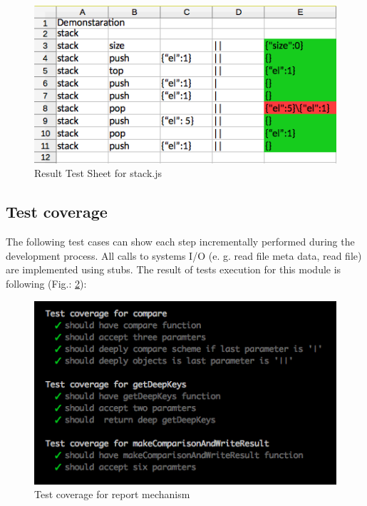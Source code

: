 {\begin{figure}[H]
	\centering
	\includegraphics[width=\linewidth]{grafiken/testSheetResult.png}
	\caption{Result Test Sheet for stack.js}
	\label{fig:resultTestSheet}
\end{figure}


\subsection{Test coverage}
The following test cases can show each step incrementally performed during the development process. All calls to systems I/O (e. g. read file meta data, read file) are implemented using stubs.
The result of tests execution  for this module is following (Fig.: \ref{fig:testReport}): 
\begin{figure}[H]
	\centering
	\includegraphics[width=\linewidth]{grafiken/testReport.png}
	\caption{Test coverage for report mechanism}
	\label{fig:testReport}
\end{figure}

}
